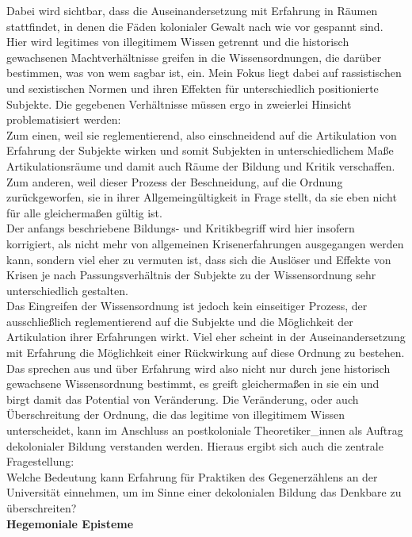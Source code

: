\noindent Dabei wird sichtbar, dass die Auseinandersetzung mit Erfahrung
in Räumen stattfindet, in denen die Fäden kolonialer Gewalt nach wie vor
gespannt sind. Hier wird legitimes von illegitimem Wissen getrennt und die
historisch gewachsenen Machtverhältnisse greifen in die Wissensordnungen, die
darüber bestimmen, was von wem sagbar ist, ein. Mein Fokus liegt dabei auf
rassistischen und sexistischen Normen und ihren Effekten für unterschiedlich
positionierte Subjekte. Die gegebenen Verhältnisse müssen ergo in zweierlei
Hinsicht problematisiert werden:\\
 Zum einen, weil sie reglementierend, also
einschneidend auf die Artikulation von Erfahrung der Subjekte wirken und somit
Subjekten in unterschiedlichem Maße Artikulationsräume und damit auch Räume der
Bildung und Kritik verschaffen. Zum anderen, weil dieser Prozess der
Beschneidung, auf die Ordnung zurückgeworfen, sie in ihrer Allgemeingültigkeit
in Frage stellt, da sie eben nicht für alle gleichermaßen gültig ist. \\
Der
anfangs beschriebene Bildungs- und Kritikbegriff wird hier insofern korrigiert,
als nicht mehr von allgemeinen Krisenerfahrungen ausgegangen werden kann,
sondern viel eher zu vermuten ist, dass sich die Auslöser und Effekte von Krisen
je nach Passungsverhältnis der Subjekte zu der Wissensordnung sehr
unterschiedlich gestalten.\\

\noindent Das Eingreifen der Wissensordnung ist jedoch kein einseitiger Prozess, der
ausschließlich reglementierend auf die Subjekte und die Möglichkeit der
Artikulation ihrer Erfahrungen wirkt. Viel eher scheint in der
Auseinandersetzung mit Erfahrung die Möglichkeit einer Rückwirkung auf diese
Ordnung zu bestehen. \\
Das sprechen aus und über Erfahrung wird also nicht nur
durch jene historisch gewachsene Wissensordnung bestimmt, es greift
gleichermaßen in sie ein und birgt damit das Potential von Veränderung. Die
Veränderung, oder auch Überschreitung der Ordnung, die das legitime von
illegitimem Wissen unterscheidet, kann im Anschluss an postkoloniale
Theoretiker\_innen als Auftrag dekolonialer Bildung verstanden werden. Hieraus
ergibt sich auch die zentrale Fragestellung: \\
Welche Bedeutung kann Erfahrung für
Praktiken des Gegenerzählens an der Universität einnehmen, um im Sinne einer
dekolonialen Bildung das Denkbare zu überschreiten?\\

\textbf{\large Hegemoniale Episteme}\\


